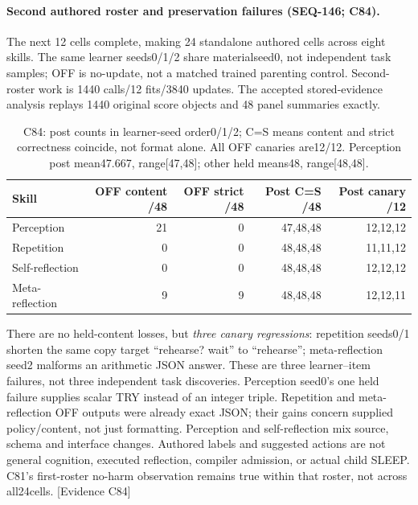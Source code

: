 \documentclass[11pt]{article}
\begin{document}
\paragraph{Second authored roster and preservation failures (SEQ-146; C84).}
The next 12 cells complete, making 24 standalone authored cells across eight
skills. The same learner seeds0/1/2 share materialseed0, not independent task
samples; OFF is no-update, not a matched trained parenting control. Second-roster
work is 1440 calls/12 fits/3840 updates. The accepted stored-evidence analysis
replays 1440 original score objects and 48 panel summaries exactly.
\begin{table}[htbp]
\centering\small
\begin{tabular}{lrrrr}
\toprule
Skill & OFF content /48 & OFF strict /48 & Post C=S /48 & Post canary /12 \\
\midrule
Perception & 21 & 0 & 47,48,48 & 12,12,12 \\
Repetition & 0 & 0 & 48,48,48 & 11,11,12 \\
Self-reflection & 0 & 0 & 48,48,48 & 12,12,12 \\
Meta-reflection & 9 & 9 & 48,48,48 & 12,12,11 \\
\bottomrule
\end{tabular}
\caption{C84: post counts in learner-seed order0/1/2; C=S means content and
strict correctness coincide, not format alone. All OFF canaries are12/12.
Perception post mean47.667, range[47,48]; other held means48, range[48,48].}
\label{tab:seq146-skills}
\end{table}
There are no held-content losses, but \emph{three canary regressions}:
repetition seeds0/1 shorten the same copy target ``rehearse? wait'' to
``rehearse''; meta-reflection seed2 malforms an arithmetic JSON answer.
These are three learner--item failures, not three independent task discoveries.
Perception seed0's one held failure supplies scalar TRY instead of an integer
triple. Repetition and meta-reflection OFF outputs were already exact JSON;
their gains concern supplied policy/content, not just formatting. Perception
and self-reflection mix source, schema and interface changes. Authored labels
and suggested actions are not general cognition, executed reflection, compiler
admission, or actual child SLEEP. C81's first-roster no-harm observation remains
true within that roster, not across all24cells. \textsf{[Evidence C84]}
\end{document}
